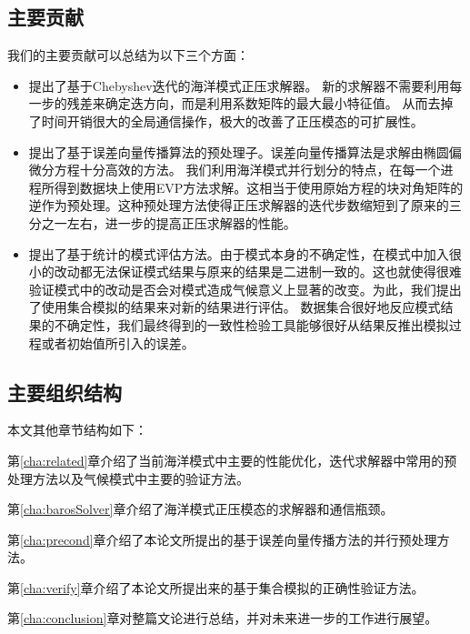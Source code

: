 \subsection{主要贡献}
我们的主要贡献可以总结为以下三个方面：
\begin{itemize}
 	\item 提出了基于Chebyshev迭代的海洋模式正压求解器。 新的求解器不需要利用每一步的残差来确定迭方向，而是利用系数矩阵的最大最小特征值。
    从而去掉了时间开销很大的全局通信操作，极大的改善了正压模态的可扩展性。
    \item 提出了基于误差向量传播算法的预处理子。误差向量传播算法是求解由椭圆偏微分方程十分高效的方法。
    我们利用海洋模式并行划分的特点，在每一个进程所得到数据块上使用EVP方法求解。这相当于使用原始方程的块对角矩阵的逆作为预处理。这种预处理方法使得正压求解器的迭代步数缩短到了原来的三分之一左右，进一步的提高正压求解器的性能。
    \item 提出了基于统计的模式评估方法。由于模式本身的不确定性，在模式中加入很小的改动都无法保证模式结果与原来的结果是二进制一致的。这也就使得很难验证模式中的改动是否会对模式造成气候意义上显著的改变。为此，我们提出了使用集合模拟的结果来对新的结果进行评估。 数据集合很好地反应模式结果的不确定性，我们最终得到的一致性检验工具能够很好从结果反推出模拟过程或者初始值所引入的误差。  
\end{itemize}
\subsection{主要组织结构}
本文其他章节结构如下：

第\ref{cha:related}章介绍了当前海洋模式中主要的性能优化，迭代求解器中常用的预处理方法以及气候模式中主要的验证方法。

第\ref{cha:barosSolver}章介绍了海洋模式正压模态的求解器和通信瓶颈。

第\ref{cha:precond}章介绍了本论文所提出的基于误差向量传播方法的并行预处理方法。

第\ref{cha:verify}章介绍了本论文所提出来的基于集合模拟的正确性验证方法。 

第\ref{cha:conclusion}章对整篇文论进行总结，并对未来进一步的工作进行展望。


